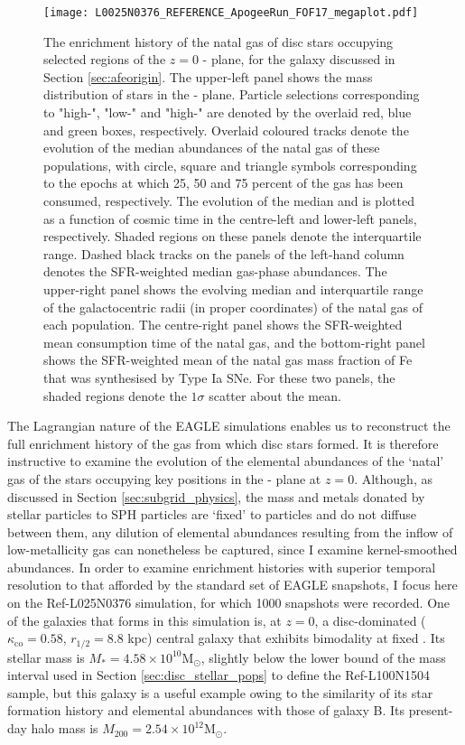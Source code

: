 \begin{figure*}
\texttt{[image: L0025N0376\_REFERENCE\_ApogeeRun\_FOF17\_megaplot.pdf]}
\caption[The history of gas (in various parameters) which forms the stellar populations of an example disc galaxy taken from the Ref-L025N0376 Simulation]{\label{fig:daddyplot} The enrichment history of the natal gas of disc stars occupying selected regions of the $z=0$ \afe{}-\feh{} plane, for the galaxy discussed in Section \ref{sec:afeorigin}. The upper-left panel shows the mass distribution of stars in the \afe{}-\feh{} plane. Particle selections corresponding to "high-\afe{}", "low-\afe{}" and "high-\feh{}" are denoted by the overlaid red, blue and green boxes, respectively. Overlaid coloured tracks denote the evolution of the median abundances of the natal gas of these populations, with circle, square and triangle symbols corresponding to the epochs at which 25, 50 and 75 percent of the gas has been consumed, respectively. The evolution of the median \afe{} and \feh{} is plotted as a function of cosmic time in the centre-left and lower-left panels, respectively. Shaded regions on these panels denote the interquartile range. Dashed black tracks on the panels of the left-hand column denotes the SFR-weighted median gas-phase abundances. The upper-right panel shows the evolving median and interquartile range of the galactocentric radii (in proper coordinates) of the natal gas of each population. The centre-right panel shows the SFR-weighted mean consumption time of the natal gas, and the bottom-right panel shows the SFR-weighted mean of the natal gas mass fraction of Fe that was synthesised by Type Ia SNe. For these two panels, the shaded regions denote the $1\sigma$ scatter about the mean.}
\end{figure*}

The Lagrangian nature of the EAGLE simulations enables us to reconstruct the full enrichment history of the gas from which disc stars formed. It is therefore instructive to examine the evolution of the elemental abundances of the `natal' gas of the stars occupying key positions in the \afe{}-\feh{} plane at $z=0$. Although, as discussed in Section \ref{sec:subgrid_physics}, the mass and metals donated by stellar particles to SPH particles are `fixed' to particles and do not diffuse between them, any dilution of elemental abundances resulting from the inflow of low-metallicity gas can nonetheless be captured, since I examine kernel-smoothed abundances. In order to examine enrichment histories with superior temporal resolution to that afforded by the standard set of EAGLE snapshots, I focus here on the Ref-L025N0376 simulation, for which 1000 snapshots were recorded. One of the galaxies that forms in this simulation is, at $z=0$, a disc-dominated ($ \kappa_{\mathrm{co}} = 0.58$, $r_{1/2} = 8.8$ kpc) central galaxy that exhibits \afe{} bimodality at fixed \feh{}. Its stellar mass is $M_{*} = 4.58\times 10^{10}\mathrm{M_{\odot}}$, slightly below the lower bound of the mass interval used in Section \ref{sec:disc_stellar_pops} to define the Ref-L100N1504 sample, but this galaxy is a useful example owing to the similarity of its star formation history and elemental abundances with those of galaxy B. Its present-day halo mass is $M_{200} = 2.54\times 10^{12}\mathrm{M_{\odot}}$.

